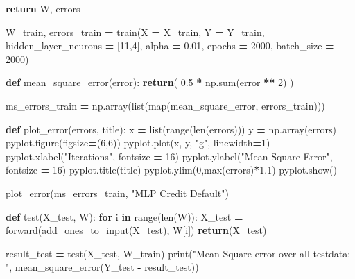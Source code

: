 \documentclass[
]{book}
\newenvironment{Shaded}{\begin{snugshade}}{\end{snugshade}}
\newcommand{\BuiltInTok}[1]{#1}
\newcommand{\ControlFlowTok}[1]{\textcolor[rgb]{0.13,0.29,0.53}{\textbf{#1}}}
\newcommand{\DecValTok}[1]{\textcolor[rgb]{0.00,0.00,0.81}{#1}}
\newcommand{\FloatTok}[1]{\textcolor[rgb]{0.00,0.00,0.81}{#1}}
\newcommand{\KeywordTok}[1]{\textcolor[rgb]{0.13,0.29,0.53}{\textbf{#1}}}
\newcommand{\NormalTok}[1]{#1}
\newcommand{\OperatorTok}[1]{\textcolor[rgb]{0.81,0.36,0.00}{\textbf{#1}}}
\newcommand{\StringTok}[1]{\textcolor[rgb]{0.31,0.60,0.02}{#1}}
\begin{document}
\begin{Shaded}
\begin{Highlighting}[]
  \ControlFlowTok{return}\NormalTok{ W, errors}



\NormalTok{W\_train, errors\_train }\OperatorTok{=}\NormalTok{ train(X }\OperatorTok{=}\NormalTok{ X\_train, Y }\OperatorTok{=}\NormalTok{ Y\_train, hidden\_layer\_neurons }\OperatorTok{=}\NormalTok{ [}\DecValTok{11}\NormalTok{,}\DecValTok{4}\NormalTok{], alpha }\OperatorTok{=} \FloatTok{0.01}\NormalTok{, epochs }\OperatorTok{=} \DecValTok{2000}\NormalTok{, batch\_size }\OperatorTok{=} \DecValTok{2000}\NormalTok{)}


\KeywordTok{def}\NormalTok{ mean\_square\_error(error):}
  \ControlFlowTok{return}\NormalTok{( }\FloatTok{0.5} \OperatorTok{*}\NormalTok{ np.}\BuiltInTok{sum}\NormalTok{(error }\OperatorTok{**} \DecValTok{2}\NormalTok{) )}

\NormalTok{ms\_errors\_train }\OperatorTok{=}\NormalTok{ np.array(}\BuiltInTok{list}\NormalTok{(}\BuiltInTok{map}\NormalTok{(mean\_square\_error, errors\_train)))}

\KeywordTok{def}\NormalTok{ plot\_error(errors, title):}
\NormalTok{  x }\OperatorTok{=} \BuiltInTok{list}\NormalTok{(}\BuiltInTok{range}\NormalTok{(}\BuiltInTok{len}\NormalTok{(errors)))}
\NormalTok{  y }\OperatorTok{=}\NormalTok{ np.array(errors)}
\NormalTok{  pyplot.figure(figsize}\OperatorTok{=}\NormalTok{(}\DecValTok{6}\NormalTok{,}\DecValTok{6}\NormalTok{))}
\NormalTok{  pyplot.plot(x, y, }\StringTok{"g"}\NormalTok{, linewidth}\OperatorTok{=}\DecValTok{1}\NormalTok{)}
\NormalTok{  pyplot.xlabel(}\StringTok{"Iterations"}\NormalTok{, fontsize }\OperatorTok{=} \DecValTok{16}\NormalTok{)}
\NormalTok{  pyplot.ylabel(}\StringTok{"Mean Square Error"}\NormalTok{, fontsize }\OperatorTok{=} \DecValTok{16}\NormalTok{)}
\NormalTok{  pyplot.title(title)}
\NormalTok{  pyplot.ylim(}\DecValTok{0}\NormalTok{,}\BuiltInTok{max}\NormalTok{(errors)}\OperatorTok{*}\FloatTok{1.1}\NormalTok{)}
\NormalTok{  pyplot.show()}
  
\NormalTok{plot\_error(ms\_errors\_train, }\StringTok{"MLP Credit Default"}\NormalTok{)}



\KeywordTok{def}\NormalTok{ test(X\_test, W):}
  \ControlFlowTok{for}\NormalTok{ i }\KeywordTok{in} \BuiltInTok{range}\NormalTok{(}\BuiltInTok{len}\NormalTok{(W)):}
\NormalTok{    X\_test }\OperatorTok{=}\NormalTok{ forward(add\_ones\_to\_input(X\_test), W[i])}
  \ControlFlowTok{return}\NormalTok{(X\_test)}
  

\NormalTok{result\_test }\OperatorTok{=}\NormalTok{ test(X\_test, W\_train)}
\BuiltInTok{print}\NormalTok{(}\StringTok{"Mean Square error over all testdata: "}\NormalTok{, mean\_square\_error(Y\_test }\OperatorTok{{-}}\NormalTok{ result\_test))}



\end{Highlighting}
\end{Shaded}
\end{document}
